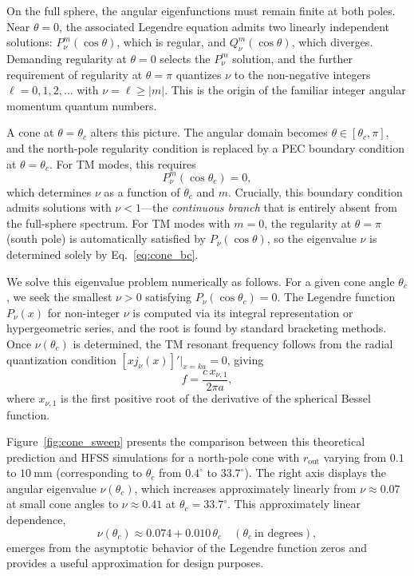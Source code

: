 \documentclass[
  aip,
  amsmath,amssymb,
  preprint
]{revtex4-1}
\begin{document}
On the full sphere, the angular eigenfunctions must remain finite at both poles. Near $\theta = 0$, the associated Legendre equation admits two linearly independent solutions: $P_\nu^m(\cos\theta)$, which is regular, and $Q_\nu^m(\cos\theta)$, which diverges. Demanding regularity at $\theta = 0$ selects the $P_\nu^m$ solution, and the further requirement of regularity at $\theta = \pi$ quantizes $\nu$ to the non-negative integers $\ell = 0, 1, 2, \ldots$ with $\nu = \ell \geq |m|$. This is the origin of the familiar integer angular momentum quantum numbers.

A cone at $\theta = \theta_c$ alters this picture. The angular domain becomes $\theta \in [\theta_c, \pi]$, and the north-pole regularity condition is replaced by a PEC boundary condition at $\theta = \theta_c$. For TM modes, this requires
\begin{equation}
\label{eq:cone_bc}
P_\nu^m(\cos\theta_c) = 0,
\end{equation}
which determines $\nu$ as a function of $\theta_c$ and $m$. Crucially, this boundary condition admits solutions with $\nu < 1$---the \emph{continuous branch} that is entirely absent from the full-sphere spectrum. For TM modes with $m = 0$, the regularity at $\theta = \pi$ (south pole) is automatically satisfied by $P_\nu(\cos\theta)$, so the eigenvalue $\nu$ is determined solely by Eq.~\eqref{eq:cone_bc}.

We solve this eigenvalue problem numerically as follows. For a given cone angle $\theta_c$, we seek the smallest $\nu > 0$ satisfying $P_\nu(\cos\theta_c) = 0$. The Legendre function $P_\nu(x)$ for non-integer $\nu$ is computed via its integral representation or hypergeometric series, and the root is found by standard bracketing methods. Once $\nu(\theta_c)$ is determined, the TM resonant frequency follows from the radial quantization condition $[x j_\nu(x)]'|_{x=ka} = 0$, giving
\begin{equation}
f = \frac{c \, x_{\nu,1}}{2\pi a},
\end{equation}
where $x_{\nu,1}$ is the first positive root of the derivative of the spherical Bessel function.

Figure~\ref{fig:cone_sweep} presents the comparison between this theoretical prediction and HFSS simulations for a north-pole cone with $r_{\mathrm{out}}$ varying from $0.1$ to $10~\mathrm{mm}$ (corresponding to $\theta_c$ from $0.4^\circ$ to $33.7^\circ$). The right axis displays the angular eigenvalue $\nu(\theta_c)$, which increases approximately linearly from $\nu \approx 0.07$ at small cone angles to $\nu \approx 0.41$ at $\theta_c = 33.7^\circ$. This approximately linear dependence,
\begin{equation}
\nu(\theta_c) \approx 0.074 + 0.010 \, \theta_c \quad (\theta_c~\text{in degrees}),
\end{equation}
emerges from the asymptotic behavior of the Legendre function zeros and provides a useful approximation for design purposes.
\end{document}

